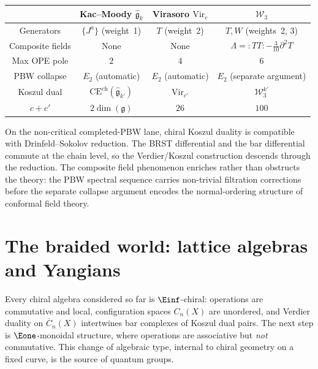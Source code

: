 \begin{center}
\small
\begin{tabular}{c|c|c|c}
& \textbf{Kac--Moody}
 $\widehat{\mathfrak{g}}_k$ &
\textbf{Virasoro}
 $\mathrm{Vir}_c$ &
$\mathcal{W}_3$ \\
\hline
Generators & $\{J^a\}$ (weight~1)
 & $T$ (weight~2)
 & $T, W$ (weights~2, 3) \\
Composite fields & None
 & None
 & $\Lambda = :\!TT\!: - \tfrac{3}{10}\partial^2 T$ \\
Max OPE pole & $2$ & $4$ & $6$ \\
PBW collapse & $E_2$ (automatic)
 & $E_2$ (automatic)
 & $E_2$ (separate argument) \\
Koszul dual & $\mathrm{CE}^{\mathrm{ch}}(\widehat{\mathfrak{g}}_{k'})$
 & $\mathrm{Vir}_{c'}$
 & $\mathcal{W}_3^{k'}$ \\
$c + c'$ & $2\dim(\mathfrak{g})$ & $26$ & $100$
\end{tabular}
\end{center}

On the non-critical completed-PBW lane, chiral Koszul duality is
compatible with Drinfeld--Sokolov reduction.
The BRST differential and the bar differential commute at the chain
level, so the Verdier/Koszul construction descends through the
reduction. The composite field phenomenon enriches rather than
obstructs the theory: the PBW spectral sequence carries non-trivial
filtration corrections before the separate collapse argument encodes
the normal-ordering structure of conformal field theory.

\section{\texorpdfstring{The braided world: lattice algebras and Yangians}{The braided world: lattice algebras and Yangians}}
\label{sec:frame-yangian-preview}

Every chiral algebra considered so far is $\Einf$-chiral: operations
are commutative and local, configuration spaces $C_n(X)$ are
unordered, and Verdier duality on $\overline{C}_n(X)$ intertwines bar
complexes of Koszul dual pairs. The next step is $\Eone$-monoidal
structure, where operations are associative but \emph{not} commutative.
This change of algebraic type, internal to chiral geometry on a fixed
curve, is the source of quantum groups.

